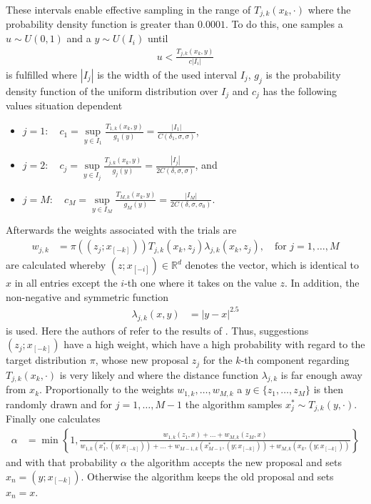 \documentclass{scrartcl}
\begin{document}
    These intervals enable effective sampling in the range of $T_{j,k}(x_k,\cdot)$ where the probability density function is greater than $0.0001$.
    To do this, one samples a $u\sim U(0,1)$ and a $y\sim U(I_i)$ until
    \begin{align*}
        u < \frac{T_{j,k}(x_k,y)}{c|I_i|}
    \end{align*}
    is fulfilled where $|I_j|$ is the width of the used interval $I_j$, $g_j$ is the probability density function of the uniform distribution over $I_j$ and $c_j$ has the following values situation dependent
    \begin{itemize}
        \item $j=1:\quad c_1=\sup\limits_{y\in I_1}\frac{T_{1,k}(x_k,y)}{g_1(y)}=\frac{|I_1|}{C(\delta_1,\sigma,\sigma)}$,
        \item $j=2:\quad c_j=\sup\limits_{y\in I_j}\frac{T_{j,k}(x_k,y)}{g_j(y)}=\frac{|I_j|}{2C(\delta,\sigma,\sigma)}$, and
        \item $j=M:\quad c_M=\sup\limits_{y\in I_M}\frac{T_{M,k}(x_k,y)}{g_M(y)}=\frac{|I_M|}{2C(\delta,\sigma,\sigma_0)}$.
    \end{itemize}
    Afterwards the weights associated with the trials are
    \begin{align*}
        w_{j,k}&=\pi((z_j;x_{[-k]}))T_{j,k}(x_k,z_j)\lambda_{j,k}(x_k,z_j),\quad\text{for }j=1,\dots,M
    \end{align*}
    are calculated whereby $(z;x_{[-i]})\in\mathbb{R}^d$ denotes the vector, which is identical to $x$ in all entries except the $i$-th one where it takes on the value $z$.
    In addition, the non-negative and symmetric function
    \begin{align*}
        \lambda_{j,k}(x,y)&=|y-x|^{2.5}%
    \end{align*}
    is used. Here the authors of \cite{lau2019} refer to the results of \cite{yang2019}. Thus, suggestions $(z_j;x_{[-k]})$ have a high weight, which have a high probability with regard to
    the target distribution $\pi$, whose new proposal $z_j$ for the $k$-th component regarding $T_{j,k}(x_k,\cdot)$ is very likely and where the distance function $\lambda_{j,k}$ is far enough away from $x_k$.
    Proportionally to the weights $w_{1,k},\dots,w_{M,k}$ a $y\in\{z_1,\dots,z_M\}$ is then randomly drawn and for $j=1,\dots,M-1$ the algorithm samples
    $x_j^*\sim T_{j,k}(y,\cdot)$. Finally one calculates
    \begin{align*}
        \alpha&=\min\left\{ 1,\frac{w_{1,k}(z_1,x)+\dots+w_{M,k}(z_M,x)}{w_{1,k}(x_1^*,(y;x_{[-k]}))+\dots+w_{M-1,k}(x_{M-1}^*,(y;x_{[-k]}))+w_{M,k}(x_k,(y;x_{[-k]}))} \right\}
    \end{align*}
    and with that probability $\alpha$ the algorithm accepts the new proposal and sets $x_n=(y;x_{[-k]})$. Otherwise the algorithm keeps the old proposal and sets $x_n=x$.
\end{document}

